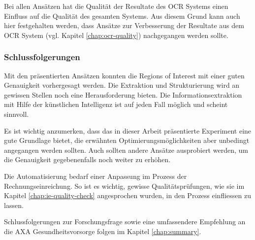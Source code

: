 Bei allen Ansätzen hat die Qualität der Resultate des OCR Systems einen Einfluss auf die Qualität des gesamten Systems. Aus diesem Grund kann auch hier festgehalten werden, dass Ansätze zur Verbesserung der Resultate aus dem OCR System (vgl. Kapitel \ref{chap:ocr-quality}) nachgegangen werden sollte.




\subsubsection{Schlussfolgerungen}

Mit den präsentierten Ansätzen konnten die Regions of Interest mit einer guten Genauigkeit vorhergesagt werden. Die Extraktion und Strukturierung wird an gewissen Stellen noch eine Herausforderung bieten. Die Informationsextraktion mit Hilfe der künstlichen Intelligenz ist auf jeden Fall möglich und scheint sinnvoll.

Es ist wichtig anzumerken, dass das in dieser Arbeit präsentierte Experiment eine gute Grundlage bietet, die erwähnten Optimierungsmöglichkeiten aber unbedingt angegangen werden sollten. Auch sollten andere Ansätze ausprobiert werden, um die Genauigkeit gegebenenfalls noch weiter zu erhöhen.

Die Automatisierung bedarf einer Anpassung im Prozess der Rechnungseinreichung. So ist es wichtig, gewisse Qualitätsprüfungen, wie sie im Kapitel \ref{chap:ie-quality-check} angesprochen wurden, in den Prozess einfliessen zu lassen.

Schlussfolgerungen zur Forschungsfrage sowie eine umfassendere Empfehlung an die AXA Gesundheitsvorsorge folgen im Kapitel \ref{chap:summary}.
